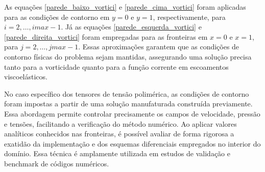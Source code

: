 As equações \eqref{parede_baixo_vortici} e \eqref{parede_cima_vortici} foram aplicadas para as condições de contorno em $ y = 0 $ e $ y = 1 $, respectivamente, para $ i = 2, \dots, imax-1 $. Já as equações \eqref{parede_esquerda_vortici} e \eqref{parede_direita_vortici} foram empregadas para as fronteiras em $ x = 0 $ e $ x = 1 $, para $ j = 2, \dots, jmax-1 $. Essas aproximações garantem que as condições de contorno físicas do problema sejam mantidas, assegurando uma solução precisa tanto para a vorticidade quanto para a função corrente em escoamentos viscoelásticos.

No caso específico dos tensores de tensão polimérica, as condições de contorno foram impostas a partir de uma solução manufaturada construída previamente. Essa abordagem permite controlar precisamente os campos de velocidade, pressão e tensões, facilitando a verificação do método numérico. Ao aplicar valores analíticos conhecidos nas fronteiras, é possível avaliar de forma rigorosa a exatidão da implementação e dos esquemas diferenciais empregados no interior do domínio. Essa técnica é amplamente utilizada em estudos de validação e benchmark de códigos numéricos.